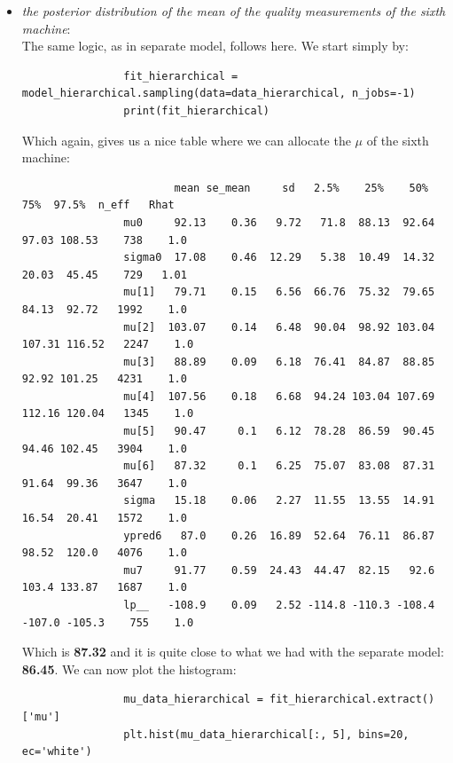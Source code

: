 \documentclass[11pt,a4paper,english]{article}
\begin{document}
          \begin{itemize}
            \item \textit{the posterior distribution of the mean of the quality measurements of the sixth machine}: \\
              The same logic, as in separate model, follows here. We start simply by:
              \begin{verbatim}
                fit_hierarchical = model_hierarchical.sampling(data=data_hierarchical, n_jobs=-1)
                print(fit_hierarchical)
              \end{verbatim}
              Which again, gives us a nice table where we can allocate the $\mu$ of the sixth machine:
              \begin{verbatim}
                        mean se_mean     sd   2.5%    25%    50%    75%  97.5%  n_eff   Rhat
                mu0     92.13    0.36   9.72   71.8  88.13  92.64  97.03 108.53    738    1.0
                sigma0  17.08    0.46  12.29   5.38  10.49  14.32  20.03  45.45    729   1.01
                mu[1]   79.71    0.15   6.56  66.76  75.32  79.65  84.13  92.72   1992    1.0
                mu[2]  103.07    0.14   6.48  90.04  98.92 103.04 107.31 116.52   2247    1.0
                mu[3]   88.89    0.09   6.18  76.41  84.87  88.85  92.92 101.25   4231    1.0
                mu[4]  107.56    0.18   6.68  94.24 103.04 107.69 112.16 120.04   1345    1.0
                mu[5]   90.47     0.1   6.12  78.28  86.59  90.45  94.46 102.45   3904    1.0
                mu[6]   87.32     0.1   6.25  75.07  83.08  87.31  91.64  99.36   3647    1.0
                sigma   15.18    0.06   2.27  11.55  13.55  14.91  16.54  20.41   1572    1.0
                ypred6   87.0    0.26  16.89  52.64  76.11  86.87  98.52  120.0   4076    1.0
                mu7     91.77    0.59  24.43  44.47  82.15   92.6  103.4 133.87   1687    1.0
                lp__   -108.9    0.09   2.52 -114.8 -110.3 -108.4 -107.0 -105.3    755    1.0
              \end{verbatim}
              Which is \textbf{87.32} and it is quite close to what we had with the separate model: \textbf{86.45}. We can now plot the histogram:
              \begin{verbatim}
                mu_data_hierarchical = fit_hierarchical.extract()['mu']
                plt.hist(mu_data_hierarchical[:, 5], bins=20, ec='white')
              \end{verbatim}

\end{itemize}
\end{document}
